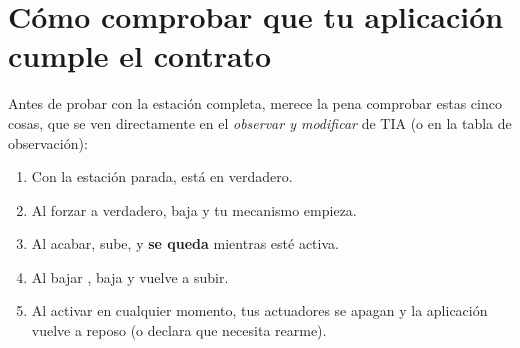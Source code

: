 \section{Cómo comprobar que tu aplicación cumple el contrato}
Antes de probar con la estación completa, merece la pena comprobar estas cinco cosas, que se ven directamente en el \emph{observar y modificar} de TIA (o en la tabla de observación):
\begin{enumerate}
\item Con la estación parada,  está en verdadero.
\item Al forzar  a verdadero,  baja y tu mecanismo empieza.
\item Al acabar,  sube, y \textbf{se queda} mientras  esté activa.
\item Al bajar ,  baja y  vuelve a subir.
\item Al activar  en cualquier momento, tus actuadores se apagan y la aplicación vuelve a reposo (o declara que necesita rearme).
\end{enumerate}
